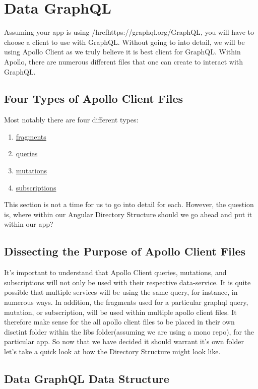 \section{ Data GraphQL }
\maketitle{}

Assuming your app is using /href{https://graphql.org/}{GraphQL}, you will have
to choose a client to use with GraphQL. Without going to into detail, we will be
using Apollo Client as we truly believe it is best client for GraphQL. Within
Apollo, there are numerous different files that one can create to interact
with GraphQL.

\subsection{Four Types of Apollo Client Files}
Most notably there are four different types:
\begin{enumerate}
  \item \href{https://www.apollographql.com/docs/angular/features/fragments}{fragments}
  \item \href{https://www.apollographql.com/docs/angular/basics/queries/}{queries}
  \item \href{https://www.apollographql.com/docs/angular/basics/mutations}{mutations}
  \item \href{https://www.apollographql.com/docs/angular/features/subscriptions}{subscriptions}
\end{enumerate}

This section is not a time for us to go into detail for each. However, the
question is, where within our Angular Directory Structure should we go ahead and
put it within our app?

\subsection{Dissecting the Purpose of Apollo Client Files}
It's important to understand that Apollo Client queries, mutations, and
subscriptions will not only be used with their respective data-service. It is
quite possible that multiple services will be using the same query, for
instance, in numerous ways. In addition, the fragments used for a particular
graphql query, mutation, or subscription, will be used within multiple apollo
client files. It therefore make sense for the all apollo client files to be
placed in their own disctint folder within the libs folder(assuming we are using
a mono repo), for the particular app. So now that we have decided it should
warrant it's own folder let's take a quick look at how the Directory Structure
might look like.

\subsection{Data GraphQL Data Structure}  
